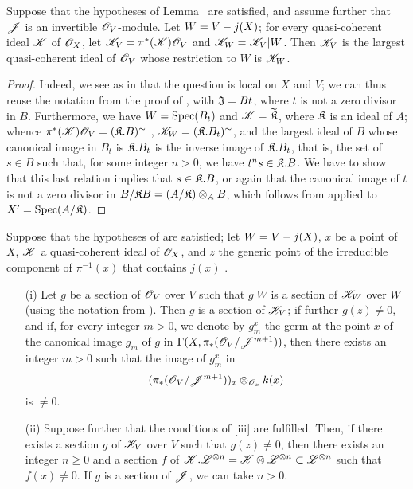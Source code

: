 \begin{corollary}[8.10.4]
\label{II.8.10.4}
Suppose that the hypotheses of Lemma~ are satisfied, and assume further that $\mathscr{J}$ is an invertible $\mathscr{O}_V$-module.
Let $W=V- j(X)$;
for every quasi-coherent ideal $\mathscr{K}$ of $\mathscr{O}_X$, let $\mathscr{K}_V=\pi^*(\mathscr{K})\mathscr{O}_V$ and $\mathscr{K}_W=\mathscr{K}_V|W$.
Then $\mathscr{K}_V$ is the largest quasi-coherent ideal of $\mathscr{O}_V$ whose restriction to $W$ is $\mathscr{K}_W$.
\end{corollary}

\begin{proof}
\label{proof-2.8.10.4}
Indeed, we see as in  that the question is local on $X$ and $V$;
we can thus reuse the notation from the proof of , with $\mathfrak{J}=Bt$, where $t$ is not a zero divisor in $B$.
Furthermore, we have $W=\operatorname{Spec}(B_t)$ and $\mathscr{K}=\widetilde{\mathfrak{K}}$, where $\mathfrak{K}$ is an ideal of $A$;
whence $\pi^*(\mathscr{K})\mathscr{O}_V=(\mathfrak{K}.B)^\sim$ , $\mathscr{K}_W=(\mathfrak{K}.B_t)^\sim$, and the largest ideal
of $B$ whose canonical image in $B_t$ is $\mathfrak{K}.B_t$ is the inverse image of $\mathfrak{K}.B_t$, that is, the set of $s\in B$ such that, for some integer $n>0$, we have $t^ns\in\mathfrak{K}.B$.
We have to show that this last relation implies that $s\in\mathfrak{K}.B$, or again that the canonical image of $t$ is not a zero divisor in $B/\mathfrak{K}B=(A/\mathfrak{K})\otimes_AB$, which follows from  applied to $X'=\operatorname{Spec}(A/\mathfrak{K})$.
\end{proof}

\begin{corollary}[8.10.5]
\label{II.8.10.5}
Suppose that the hypotheses of  are satisfied;
let $W=V- j(X)$, $x$ be a point of $X$, $\mathscr{K}$ a quasi-coherent ideal of $\mathscr{O}_X$, and $z$ the generic point of the irreducible component of $\pi^{-1}(x)$ that contains $j(x)$ .
\begin{enumerate}
    \item[\rm{(i)}] Let $g$ be a section of $\mathscr{O}_V$ over $V$ such that $g|W$ is a section of $\mathscr{K}_W$ over $W$ (using the notation from ).
        Then $g$ is a section of $\mathscr{K}_V$;
        if further $g(z)\neq0$, and if, for every integer $m>0$, we denote by $g_m^x$ the germ at the point $x$ of the canonical image $g_m$ of $g$ in $\Gamma(X,\pi_*(\mathscr{O}_V/\mathscr{J}^{m+1}))$, then there exists an integer $m>0$ such that the image of $g_m^x$ in
        \[
            (\pi_*(\mathscr{O}_V/\mathscr{J}^{m+1}))_x \otimes_{\mathscr{O}_x} k(x)
        \]
        is $\neq0$.
    \item[\rm{(ii)}] Suppose further that the conditions of [iii] are fulfilled.
        Then, if there exists a section $g$ of $\mathscr{K}_V$ over $V$ such that $g(z)\neq0$, then there exists an integer $n\geq0$ and a section $f$ of $\mathscr{K}.\mathscr{L}^{\otimes n}=\mathscr{K}\otimes\mathscr{L}^{\otimes n}\subset\mathscr{L}^{\otimes n}$ such that $f(x)\neq0$.
        If $g$ is a section of $\mathscr{J}$, we can take $n>0$.
\end{enumerate}
\end{corollary}


